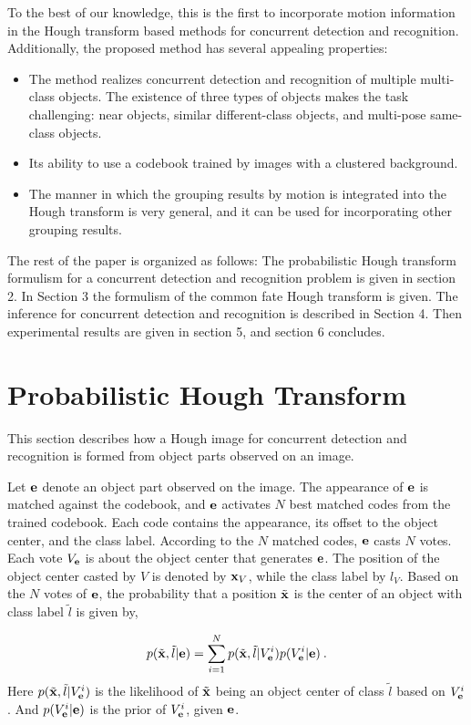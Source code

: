 \documentclass[10pt,twocolumn,letterpaper]{article}
\begin{document}
To the best of our knowledge, this is the first to incorporate motion information in the Hough transform based methods for concurrent detection and recognition. Additionally, the proposed method has several appealing properties:
\begin{itemize}
\item {The method realizes concurrent detection and recognition of multiple multi-class objects. The existence of three types of objects makes the task challenging: near objects, similar different-class objects, and multi-pose same-class objects.}
\item {Its ability to use a codebook trained by images with a clustered background.}
\item {The manner in which the grouping results by motion is integrated into the Hough transform is very general, and it can be used for incorporating other grouping results.}
\end{itemize}

The rest of the paper is organized as follows: The probabilistic Hough transform formulism for a concurrent detection and recognition problem is given in section 2. In Section 3 the formulism of the common fate Hough transform is given. The inference for concurrent detection and recognition is described in Section 4. Then experimental results are given in section 5, and section 6 concludes.


\section{Probabilistic Hough Transform}
This section describes how a Hough image for concurrent detection and recognition is formed from object parts observed on an image.

Let $\bf{e}$ denote an object part observed on the image. The appearance of $\bf{e}$ is matched against the codebook, and $\bf{e}$ activates $N$ best matched codes from the trained codebook. Each code contains the appearance, its offset to the object center, and the class label. According to the $N$ matched codes, $\bf{e}$ casts $N$ votes. Each vote $V_{\bf{e}}$ is about the object center that generates $\bf{e}$. The position of the object center casted by $V$ is denoted by ${\bf{x}}_V$, while the class label by $l_V$. Based on the $N$ votes of $\bf{e}$, the probability that a position $\tilde{\bf{x}}$ is the center of an object with class label $\tilde{l}$ is given by,

\begin{equation}p({\tilde{\bf{x}}},\tilde{l}|{\bf{e}}) = \sum\limits^N_{i=1} {p({\tilde{\bf{x}}},{\tilde{l}}|{V_{\bf{e}}^i}) p({V_{\bf{e}}^i}|{\bf{e}})}\:.
\label{eq1}
\end{equation}
Here $p({\tilde{\bf{x}}},{\tilde{l}}|{V_{\bf{e}}^i})$ is the likelihood of ${\tilde{\bf{x}}}$ being an object center of class ${\tilde{l}}$ based on $V_{\bf{e}}^i$. And $p({V_{\bf{e}}^i}|{\bf{e}})$ is the prior of ${V_{\bf{e}}^i}$, given ${\bf{e}}$.
\end{document}
